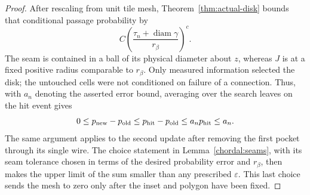 \begin{proof}
After rescaling from unit tile mesh, Theorem~\ref{thm:actual-disk}
bounds that conditional passage probability by
\[
 C\left(\frac{\tau_n+\operatorname{diam}\gamma}{r_\beta}\right)^c.
\]
The seam is contained in a ball of its physical diameter about $z$,
whereas $J$ is at a fixed positive radius comparable to $r_\beta$.
Only measured information selected the disk; the untouched cells
were not conditioned on failure of a connection.  Thus, with $a_n$
denoting the asserted error bound, averaging over the search leaves
on the hit event gives
\[
 0\le p_{\rm new}-p_{\rm old}
 \le p_{\rm hit}-p_{\rm old}
 \le a_n p_{\rm hit}\le a_n.
\]
The same argument applies to the second update after removing the
first pocket through its single wire.  The choice
statement in Lemma~\ref{chordal:seams}, with its seam tolerance chosen
in terms of the desired probability error and $r_\beta$, then makes
the upper limit of the sum smaller than any prescribed
$\varepsilon$.  This last choice sends the mesh to zero only after
the inset and polygon have been fixed.
\end{proof}



